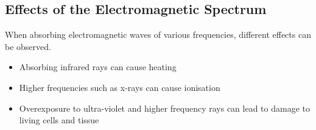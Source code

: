 \documentclass[../main.tex]{subfiles}
\begin{document}
	\subsection{Effects of the Electromagnetic Spectrum}
	When absorbing electromagnetic waves of various frequencies, different effects can be observed.
	\begin{itemize}
		\item Absorbing infrared rays can cause heating
		\item Higher frequencies such as x-rays can cause ionisation
		\item Overexposure to ultra-violet and higher frequency rays can lead to damage to living cells and tissue
	\end{itemize}
\end{document}
